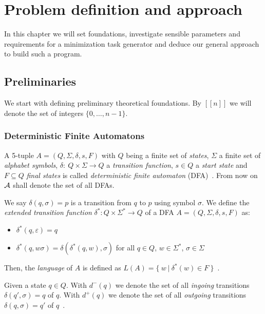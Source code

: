 
\chapter{Problem definition and approach} \label{ch:2}

In this chapter we will set foundations, investigate sensible parameters and requirements for a minimization task generator and deduce our general approach to build such a program.

\section{Preliminaries}

We start with defining preliminary theoretical foundations. By $[[n]]$ we will denote the set of integers $\{0,\ldots,n-1\}$.

\subsection{Deterministic Finite Automatons}

A 5-tuple $A = (Q, \Sigma, \delta, s, F)$ with $Q$ being a finite set of \emph{states}, $\Sigma$ a finite set of \emph{alphabet symbols}, $\delta \colon\ Q \times \Sigma \to Q$ a \emph{transition function}, $s \in Q$ a \emph{start state} and $F \subseteq Q$ \emph{final states} is called \emph{deterministic finite automaton} (DFA)~\cite[p. 46]{HMU01}. From now on $\mathcal{A}$ shall denote the set of all DFAs.

We say $\delta(q,\sigma) = p$ is a transition from $q$ to $p$ using symbol $\sigma$. We define the \emph{extended transition function} $\delta^* : Q \times \Sigma^* \to Q$ of a DFA $A = (Q, \Sigma, \delta, s, F)$ as:
\begin{itemize}
	\item $\delta^*(q,\varepsilon) = q$
	\item $\delta^*(q,w\sigma) = \delta(\delta^*(q,w),\sigma)$ for all $q \in Q$, $w \in \Sigma^*$, $\sigma \in \Sigma$
\end{itemize}
Then, the \emph{language} of $A$ is defined as $L(A) = \{\ w\ |\ \delta^*(w) \in F\ \}$~\cite[pp. 49-50. 52]{HMU01}.

Given a state $q \in Q$. With $d^-(q)$ we denote the set of all \emph{ingoing} transitions $\delta(q', \sigma) = q$ of $q$. With $d^+(q)$ we denote the set of all \emph{outgoing} transitions $\delta(q, \sigma) = q'$ of $q$~\cite[pp. 2-3]{CP05}.

